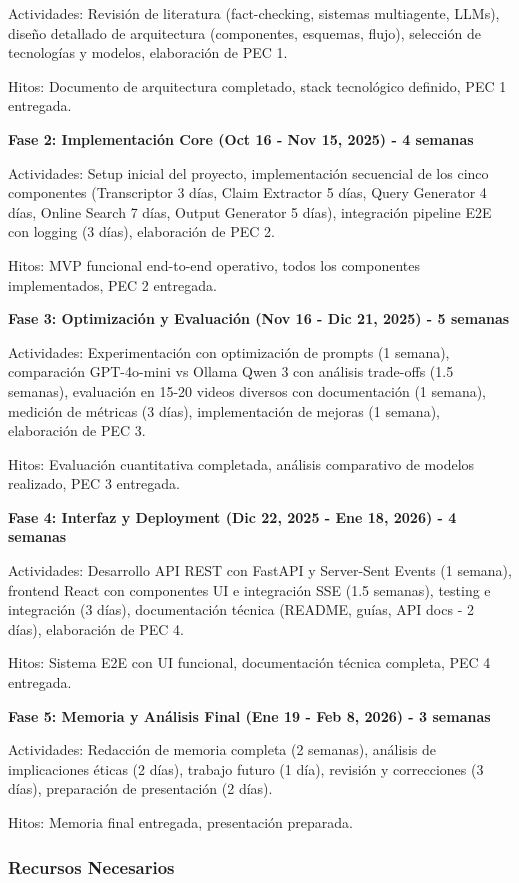 \documentclass[12pt,a4paper,twoside]{book}
\begin{document}
Actividades: Revisión de literatura (fact-checking, sistemas multiagente, LLMs), diseño detallado de arquitectura (componentes, esquemas, flujo), selección de tecnologías y modelos, elaboración de PEC 1.

Hitos: Documento de arquitectura completado, stack tecnológico definido, PEC 1 entregada.

\textbf{Fase 2: Implementación Core (Oct 16 - Nov 15, 2025) - 4 semanas}

Actividades: Setup inicial del proyecto, implementación secuencial de los cinco componentes (Transcriptor 3 días, Claim Extractor 5 días, Query Generator 4 días, Online Search 7 días, Output Generator 5 días), integración pipeline E2E con logging (3 días), elaboración de PEC 2.

Hitos: MVP funcional end-to-end operativo, todos los componentes implementados, PEC 2 entregada.

\textbf{Fase 3: Optimización y Evaluación (Nov 16 - Dic 21, 2025) - 5 semanas}

Actividades: Experimentación con optimización de prompts (1 semana), comparación GPT-4o-mini vs Ollama Qwen 3 con análisis trade-offs (1.5 semanas), evaluación en 15-20 videos diversos con documentación (1 semana), medición de métricas (3 días), implementación de mejoras (1 semana), elaboración de PEC 3.

Hitos: Evaluación cuantitativa completada, análisis comparativo de modelos realizado, PEC 3 entregada.

\textbf{Fase 4: Interfaz y Deployment (Dic 22, 2025 - Ene 18, 2026) - 4 semanas}

Actividades: Desarrollo API REST con FastAPI y Server-Sent Events (1 semana), frontend React con componentes UI e integración SSE (1.5 semanas), testing e integración (3 días), documentación técnica (README, guías, API docs - 2 días), elaboración de PEC 4.

Hitos: Sistema E2E con UI funcional, documentación técnica completa, PEC 4 entregada.

\textbf{Fase 5: Memoria y Análisis Final (Ene 19 - Feb 8, 2026) - 3 semanas}

Actividades: Redacción de memoria completa (2 semanas), análisis de implicaciones éticas (2 días), trabajo futuro (1 día), revisión y correcciones (3 días), preparación de presentación (2 días).

Hitos: Memoria final entregada, presentación preparada.

\subsubsection{Recursos Necesarios}
\end{document}
